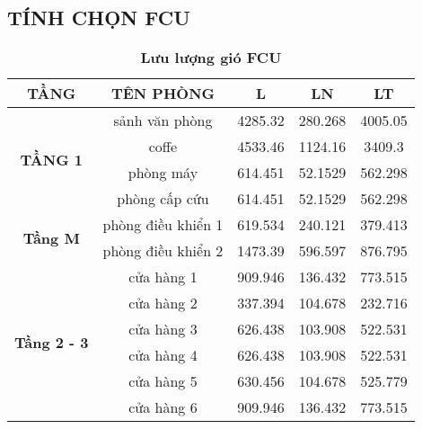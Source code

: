 \subsection{TÍNH CHỌN FCU}
\begin{table}[H]
	\centering
	\caption{\textbf{Lưu lượng gió FCU}}
	\begin{tabular}{|c|c|c|c|c|}
		\hline
		\textbf{TẦNG} & \textbf{TÊN PHÒNG} & \textbf{L } & \textbf{LN} & \textbf{LT} \bigstrut\\
		\hline
		\multirow{4}[8]{*}{\textbf{TẦNG 1}} & sảnh văn phòng & 4285.32 & 280.268 & 4005.05 \bigstrut\\
		\cline{2-5}      & coffe & 4533.46 & 1124.16 & 3409.3 \bigstrut\\
		\cline{2-5}      & phòng máy & 614.451 & 52.1529 & 562.298 \bigstrut\\
		\cline{2-5}      & phòng cấp cứu & 614.451 & 52.1529 & 562.298 \bigstrut\\
		\hline
		\multirow{2}[4]{*}{\textbf{Tầng M}} & phòng điều khiển 1 & 619.534 & 240.121 & 379.413 \bigstrut\\
		\cline{2-5}      & phòng điều khiển 2 & 1473.39 & 596.597 & 876.795 \bigstrut\\
		\hline
		\multirow{6}[12]{*}{\textbf{Tầng 2 - 3}} & cửa hàng 1 & 909.946 & 136.432 & 773.515 \bigstrut\\
		\cline{2-5}      & cửa hàng 2 & 337.394 & 104.678 & 232.716 \bigstrut\\
		\cline{2-5}      & cửa hàng 3 & 626.438 & 103.908 & 522.531 \bigstrut\\
		\cline{2-5}      & cửa hàng 4 & 626.438 & 103.908 & 522.531 \bigstrut\\
		\cline{2-5}      & cửa hàng 5 & 630.456 & 104.678 & 525.779 \bigstrut\\
		\cline{2-5}      & cửa hàng 6 & 909.946 & 136.432 & 773.515 \bigstrut\\
		\hline
	\end{tabular}%
\end{table}

